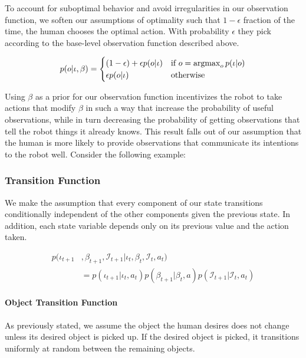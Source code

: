 \documentclass[conference]{IEEEtran}
\newcommand{\Iota}{\mathcal{I}}
\newcommand{\argmax}{\operatornamewithlimits{argmax}}
\begin{document}
To account for suboptimal behavior and avoid irregularities in our observation function, we soften our assumptions of optimality such that $1-\epsilon$ fraction of the time, the human chooses the optimal action. With probability $\epsilon$ they pick according to the base-level observation function described above. 

\begin{equation*} 
	p(o | \iota, \beta) = \begin{cases}
		(1-\epsilon) + \epsilon p(o|\iota) & \text{if } o = \argmax_o p(\iota|o) \\
		\epsilon p(o|\iota) & \text{otherwise}
	\end{cases}
\end{equation*}

Using $\beta$ as a prior for our observation function incentivizes the robot to take actions that modify $\beta$ in such a way that increase the probability of useful observations, while in turn decreasing the probability of getting observations that tell the robot things it already knows. This result falls out of our assumption that the human is more likely to provide observations that communicate its intentions to the robot well. Consider the following example: 




\subsubsection{Transition Function} \label{sssec:tf}

We make the assumption that every component of our state transitions conditionally independent of the other components given the previous state. In addition, each state variable depends only on its previous value and the action taken. 

\begin{align*}
	p(\iota_{t+1}&, \beta_{t+1}, \Iota_{t+1} | \iota_t, \beta_t, \Iota_t, a_t) \\
	&=  p(\iota_{t+1} | \iota_t, a_t) p(\beta_{t+1} | \beta_t, a) p(\Iota_{t+1} | \Iota_t, a_t)
\end{align*}

\paragraph{Object Transition Function}
As previously stated, we assume the object the human desires does not change unless its desired object is picked up. If the desired object is picked, it transitions uniformly at random between the remaining objects. 
\end{document}
